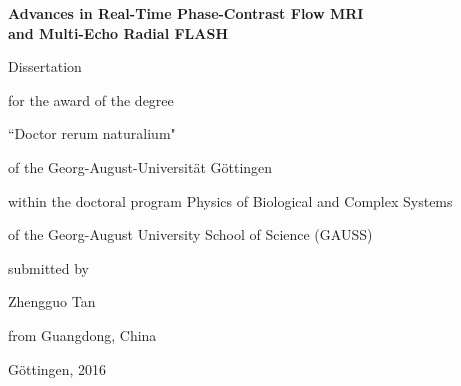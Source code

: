 \documentclass[a4paper,11pt,twoside,openright]{scrbook}
\begin{document}
\begin{titlepage}

\begin{center}

\vspace*{\fill}

{\bfseries 
  {\LARGE  
    Advances in Real-Time Phase-Contrast Flow MRI \\
    \vspace*{0.25\baselineskip}
    and Multi-Echo Radial FLASH
  } 
}

\vspace{3\baselineskip}

{\Large
  Dissertation \par 
  for the award of the degree \par 
  ``Doctor rerum naturalium" \par 
  of the Georg-August-Universit\"{a}t G\"{o}ttingen

  \vspace*{2\baselineskip}

  within the doctoral program Physics of Biological and Complex Systems \par 
  of the Georg-August University School of Science (GAUSS) 

  \vspace*{2\baselineskip}
  submitted by \par 
  \vspace*{2\baselineskip}
  
  Zhengguo Tan \par 
  from Guangdong, China

  \vspace*{\fill}
  G\"{o}ttingen, 2016
}

\end{center}

\end{titlepage}
\end{document}
